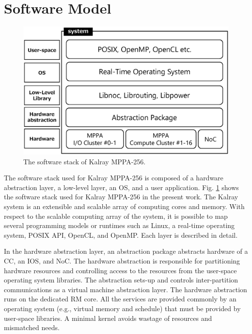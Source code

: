 \section{Software Model}
\label{sec:software_model}

\begin{figure}[!htbp]
  \centering
  \includegraphics[width=0.7\linewidth]{../figure/softwarestack.eps}   
  \caption{\label{fig:software_stack}
    The software stack of Kalray MPPA-256.}     
\end{figure}

The software stack used for Kalray MPPA-256 is composed of a hardware abstraction layer, a low-level layer, an OS, and a user application.  
Fig. \ref{fig:software_stack} shows the software stack used for Kalray MPPA-256 in the present work.
The Kalray system is an extensible and scalable array of computing cores and memory.
With respect to the scalable computing array of the system, it is possible to map several programming models or runtimes such as Linux, a real-time operating system, POSIX API, OpenCL, and OpenMP.
Each layer is described in detail.

In the hardware abstraction layer, an abstraction package abstracts hardware of a CC, an IOS, and NoC.
The hardware abstraction is responsible for partitioning hardware resources and controlling access to the resources from the user-space operating system libraries.
The abstraction sets-up and controls inter-partition communications as a virtual machine abstraction layer.
The hardware abstraction runs on the dedicated RM core.
All the services are provided commonly by an operating system (e.g., virtual memory and schedule) that must be provided by user-space libraries.
A minimal kernel avoids wastage of resources and mismatched needs.

